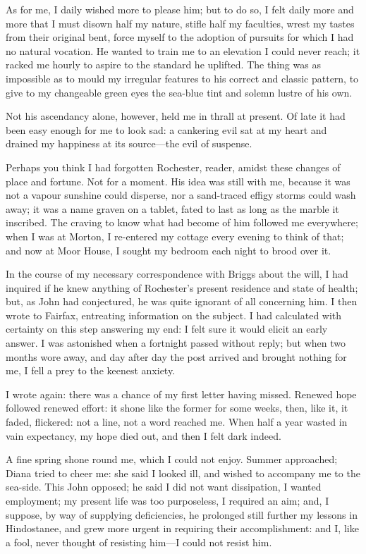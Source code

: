As for me, I daily wished more to please him; but to do so, I felt daily
more and more that I must disown half my nature, stifle half my
faculties, wrest my tastes from their original bent, force myself to the
adoption of pursuits for which I had no natural vocation. He wanted to
train me to an elevation I could never reach; it racked me hourly to
aspire to the standard he uplifted. The thing was as impossible as to
mould my irregular features to his correct and classic pattern, to give
to my changeable green eyes the sea-blue tint and solemn lustre of his
own.

Not his ascendancy alone, however, held me in thrall at present. Of
late it had been easy enough for me to look sad: a cankering evil sat at
my heart and drained my happiness at its source---the evil of suspense.

Perhaps you think I had forgotten \Mr{} Rochester, reader, amidst these
changes of place and fortune. Not for a moment. His idea was still
with me, because it was not a vapour sunshine could disperse, nor a
sand-traced effigy storms could wash away; it was a name graven on a
tablet, fated to last as long as the marble it inscribed. The craving
to know what had become of him followed me everywhere; when I was at
Morton, I re-entered my cottage every evening to think of that; and now
at Moor House, I sought my bedroom each night to brood over it.

In the course of my necessary correspondence with \Mr{} Briggs about the
will, I had inquired if he knew anything of \Mr{} Rochester's present
residence and state of health; but, as \St{} John had conjectured, he was
quite ignorant of all concerning him. I then wrote to \Mrs{} Fairfax,
entreating information on the subject. I had calculated with certainty
on this step answering my end: I felt sure it would elicit an early
answer. I was astonished when a fortnight passed without reply; but
when two months wore away, and day after day the post arrived and
brought nothing for me, I fell a prey to the keenest anxiety.

I wrote again: there was a chance of my first letter having missed. 
Renewed hope followed renewed effort: it shone like the former for some
weeks, then, like it, it faded, flickered: not a line, not a word
reached me. When half a year wasted in vain expectancy, my hope died
out, and then I felt dark indeed.

A fine spring shone round me, which I could not enjoy. Summer
approached; Diana tried to cheer me: she said I looked ill, and wished
to accompany me to the sea-side. This \St{} John opposed; he said I did
not want dissipation, I wanted employment; my present life was too
purposeless, I required an aim; and, I suppose, by way of supplying
deficiencies, he prolonged still further my lessons in Hindostanee, and
grew more urgent in requiring their accomplishment: and I, like a fool,
never thought of resisting him---I could not resist him.

